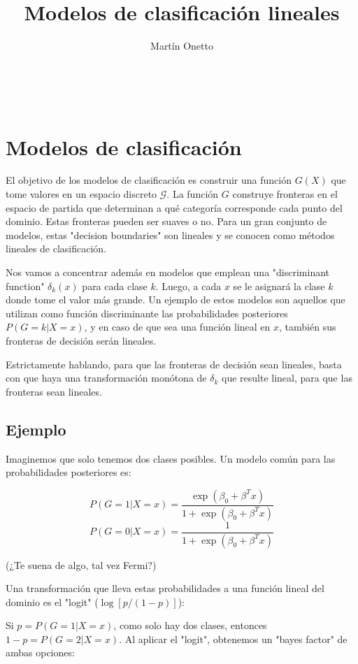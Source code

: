 \documentclass[aps,onecolumn,12pt,notitlepage]{revtex4-1}
\begin{document}
\renewcommand{\andname}{y}
\renewcommand{\tablename}{Tabla}
\renewcommand{\labelenumi}{\Roman{enumi}.}

\title{Modelos de clasificación lineales}
\author{Martín Onetto} 
\maketitle
\
\section{Modelos de clasificación}
El objetivo de los modelos de clasificación es construir una función \(G(X)\) que tome valores en un espacio discreto \(\mathcal{G}\). La función \(G\) construye fronteras en el espacio de partida que determinan a qué categoría corresponde cada punto del dominio. Estas fronteras pueden ser suaves o no. Para un gran conjunto de modelos, estas "decision boundaries" son lineales y se conocen como métodos lineales de clasificación.

Nos vamos a concentrar además en modelos que emplean una "discriminant function" \(\delta_k(x)\) para cada clase \(k\). Luego, a cada \(x\) se le asignará la clase \(k\) donde tome el valor más grande. Un ejemplo de estos modelos son aquellos que utilizan como función discriminante las probabilidades posteriores \(P(G=k|X=x)\), y en caso de que sea una función lineal en \(x\), también sus fronteras de decisión serán lineales. 

Estrictamente hablando, para que las fronteras de decisión sean lineales, basta con que haya una transformación monótona de \(\delta_k\) que resulte lineal, para que las fronteras sean lineales.

\subsection*{Ejemplo}

Imaginemos que solo tenemos dos clases posibles. Un modelo común para las probabilidades posteriores es:

\[
P(G=1|X=x) = \frac{\exp(\beta_0 + \beta^T x)}{1+\exp(\beta_0 + \beta^T x)}
\]
\[
P(G=0|X=x) = \frac{1}{1+\exp(\beta_0 + \beta^T x)}
\]

(¿Te suena de algo, tal vez Fermi?)

Una transformación que lleva estas probabilidades a una función lineal del dominio es el "logit" (\(\log[p/(1-p)]\)):

Si \(p = P(G=1|X=x)\), como solo hay dos clases, entonces \(1-p = P(G=2|X=x)\). Al aplicar el "logit", obtenemos un "bayes factor" de ambas opciones:
\end{document}
